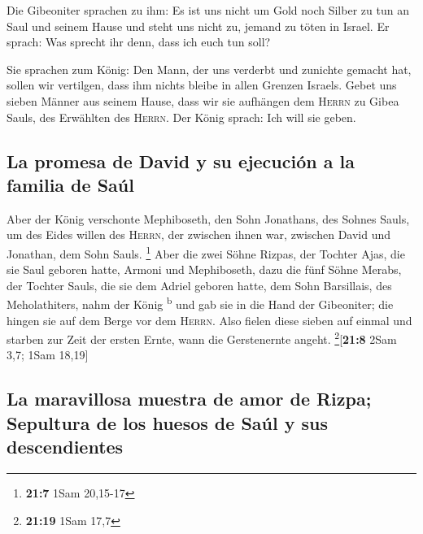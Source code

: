  Die Gibeoniter sprachen zu ihm: Es ist uns nicht um Gold
noch Silber zu tun an Saul und seinem Hause und steht uns nicht zu,
jemand zu töten in Israel. Er sprach: Was sprecht ihr denn, dass ich
euch tun soll?

 Sie sprachen zum König: Den Mann, der uns verderbt und
zunichte gemacht hat, sollen wir vertilgen, dass ihm nichts bleibe in
allen Grenzen Israels.  Gebet uns sieben Männer aus seinem
Hause, dass wir sie aufhängen dem \textsc{Herrn} zu Gibea Sauls, des
Erwählten des \textsc{Herrn}. Der König sprach: Ich will sie geben.

\hypertarget{la-promesa-de-david-y-su-ejecuciuxf3n-a-la-familia-de-sauxfal}{%
\subsection{La promesa de David y su ejecución a la familia de
Saúl}\label{la-promesa-de-david-y-su-ejecuciuxf3n-a-la-familia-de-sauxfal}}

 Aber der König verschonte Mephiboseth, den Sohn
Jonathans, des Sohnes Sauls, um des Eides willen des \textsc{Herrn}, der
zwischen ihnen war, zwischen David und Jonathan, dem Sohn Sauls.
\footnote{\textbf{21:7} 1Sam 20,15-17}  Aber die zwei
Söhne Rizpas, der Tochter Ajas, die sie Saul geboren hatte, Armoni und
Mephiboseth, dazu die fünf Söhne Merabs, der Tochter Sauls, die sie dem
Adriel geboren hatte, dem Sohn Barsillais, des Meholathiters, nahm der
König \textsuperscript{b}  und gab sie in die Hand der
Gibeoniter; die hingen sie auf dem Berge vor dem \textsc{Herrn}. Also
fielen diese sieben auf einmal und starben zur Zeit der ersten Ernte,
wann die Gerstenernte angeht. \footnote{\textbf{21:19} 1Sam 17,7}{[}\textbf{21:8}
2Sam 3,7; 1Sam 18,19{]}

\hypertarget{la-maravillosa-muestra-de-amor-de-rizpa-sepultura-de-los-huesos-de-sauxfal-y-sus-descendientes}{%
\subsection{La maravillosa muestra de amor de Rizpa; Sepultura de los
huesos de Saúl y sus
descendientes}\label{la-maravillosa-muestra-de-amor-de-rizpa-sepultura-de-los-huesos-de-sauxfal-y-sus-descendientes}}

